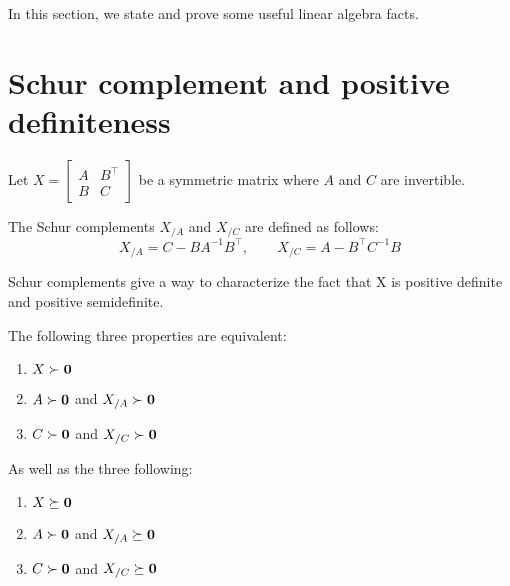 In this section, we state and prove some useful linear algebra facts.

\section{Schur complement and positive definiteness}\label{sec:schur_complement}

Let $X = \begin{bmatrix}
             A & B^\top\\
             B & C
    \end{bmatrix}$
be a symmetric matrix where $A$ and $C$ are invertible.
\begin{definition}
    The Schur complements $X_{/A}$ and $X_{/C}$ are defined as follows:
    \begin{equation*}
        X_{/A} = C - B A^{-1} B^\top
        ,\qquad
        X_{/C} = A - B^\top C^{-1} B
    \end{equation*}
\end{definition}
Schur complements give a way to characterize the fact that X is positive definite and positive semidefinite.
\begin{lemma}
    The following three properties are equivalent:
    \begin{enumerate}
        \item $X \succ \mathbf{0}$
        \item $A \succ \mathbf{0}$ and $X_{/A} \succ \mathbf{0}$
        \item $C \succ \mathbf{0}$ and $X_{/C} \succ \mathbf{0}$
    \end{enumerate}
    As well as the three following:
    \begin{enumerate}
        \item $X \succeq \mathbf{0}$
        \item $A \succ \mathbf{0}$ and $X_{/A} \succeq \mathbf{0}$
        \item $C \succ \mathbf{0}$ and $X_{/C} \succeq \mathbf{0}$
    \end{enumerate}
\end{lemma}
